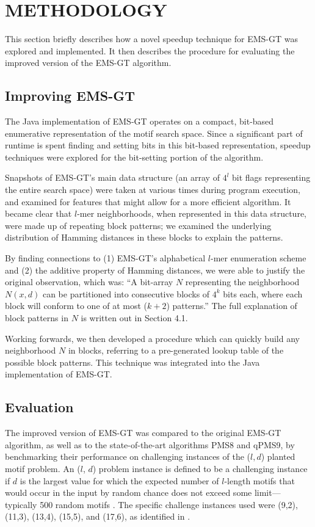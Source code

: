 \documentclass[oneside,12pt]{DISCSthesis}
\begin{document}
{%
	\normalsize{}

\chapter{METHODOLOGY}
	This section briefly describes how a novel speedup technique for EMS-GT was explored and implemented.
	It then describes the procedure for evaluating the improved version of the EMS-GT algorithm.

	\section{Improving EMS-GT}
		The Java implementation of EMS-GT operates on a compact, bit-based enumerative representation of the motif search space. Since a significant part of runtime is spent finding and setting bits in this bit-based representation, speedup techniques were explored for the bit-setting portion of the algorithm.

		Snapshots of EMS-GT's main data structure (an array of $4^l$ bit flags representing the entire search space) were taken at various times during program execution, and examined for features that might allow for a more efficient algorithm. It became clear that $l$-mer neighborhoods, when represented in this data structure, were made up of repeating block patterns; we examined the underlying distribution of Hamming distances in these blocks to explain the patterns.

		By finding connections to (1) EMS-GT's alphabetical $l$-mer enumeration scheme and (2) the additive property of Hamming distances, we were able to justify the original observation, which was: ``A bit-array $N$ representing the neighborhood $N(x,d)$ can be partitioned into consecutive blocks of $4^k$ bits each, where each block will conform to one of at most ($k+2$) patterns.'' The full explanation of block patterns in $N$ is written out in Section 4.1.
		
		Working forwards, we then developed a procedure which can quickly build any neighborhood $N$ in blocks, referring to a pre-generated lookup table of the possible block patterns. This technique was integrated into the Java implementation of EMS-GT.

	\section{Evaluation}
		The improved version of EMS-GT was compared to the original EMS-GT algorithm, as well as to the state-of-the-art algorithms PMS8 and qPMS9, by benchmarking their performance on challenging instances of the ($l, d$) planted motif problem.
		An ($l$, $d$) problem instance is defined to be a challenging instance if $d$ is the largest value for which the expected number of $l$-length motifs that would occur in the input by random chance does not exceed some limit---typically 500 random motifs \cite{pms2015}. The specific challenge instances used were (9,2), (11,3), (13,4), (15,5), and (17,6), as identified in \cite{pms2015,pms2007}. 

}
\end{document}
